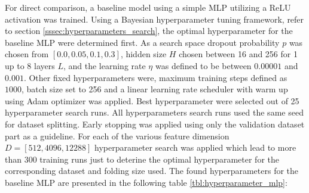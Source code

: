\documentclass[../main.tex]{subfiles}
\begin{document}
For direct comparison, a baseline model using a simple MLP utilizing a ReLU activation was trained. Using a Bayesian hyperparameter tuning framework, refer to section \ref{sssec:hyperparameters_search}, the optimal hyperparameter for the baseline MLP were determined first. As a search space dropout probability $p$ was chosen from $[0.0, 0.05, 0.1, 0.3]$, hidden size $H$ chosen between 16 and 256 for 1 up to 8 layers $L$, and the learning rate $\eta$ was defined to be between $0.00001$ and $0.001$. Other fixed hyperparameters were, maximum training steps defined as $1000$, batch size set to 256 and a linear learning rate scheduler with warm up using Adam optimizer was applied. Best hyperparameter were selected out of 25 hyperparameter search runs. All hyperparameters search runs used the same seed for dataset splitting. Early stopping was applied using only the validation dataset part as a guideline. For each of the various feature dimension $D=[512, 4096, 12288]$ hyperparameter search was applied which lead to more than 300 training runs just to deterine the optimal hyperparameter for the corresponding dataset and folding size used. The found hyperparameters for the baseline MLP are presented in the following table \ref{tbl:hyperparameter_mlp}:
\newline
\end{document}
